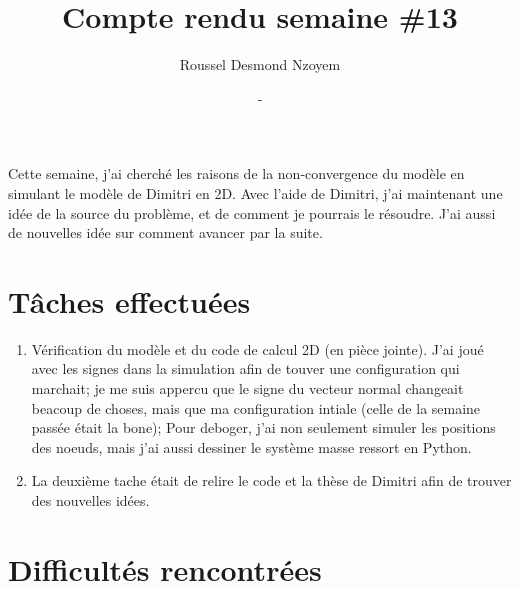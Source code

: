 \documentclass[
  french,
	11pt, %
]{fphw}
\title{\sf\bfseries Compte rendu semaine \#13} %
\author{Roussel Desmond Nzoyem} %
\date{\DTMdisplaydate{2021}{4}{28}{-1} - \DTMdisplaydate{2021}{5}{3}{-1}} %
\institute{Sorbonne Université \\ Laboratoire Jacques-Louis Lions} %
\begin{document}
\maketitle %


Cette semaine, j'ai cherché les raisons de la non-convergence du modèle en simulant le modèle de Dimitri en 2D. Avec l'aide de Dimitri, j'ai maintenant une idée de la source du problème, et de comment je pourrais le résoudre. J'ai aussi de nouvelles idée sur comment avancer par la suite.





\section*{Tâches effectuées}

\begin{enumerate}
  \item Vérification du modèle et du code de calcul 2D (en pièce jointe). J'ai joué avec les signes dans la simulation afin de touver une configuration qui marchait; je me suis appercu que le signe du vecteur normal changeait beacoup de choses, mais que ma configuration intiale (celle de la semaine passée était la bone); Pour deboger, j'ai non seulement simuler les positions des noeuds, mais j'ai aussi dessiner le système masse ressort en Python.
  \item La deuxième tache était de relire le code et la thèse de Dimitri afin de trouver des nouvelles idées.
\end{enumerate}



\section*{Difficultés rencontrées}
\end{document}
